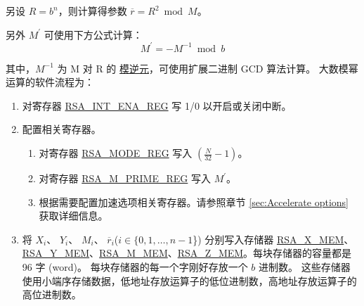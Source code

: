 \documentclass[main\_\_CN.tex]{subfiles}
\begin{document}
另设 \begin{math}R = b^{n}\end{math}，则计算得参数 \begin{math}\overline{r} = R^{2} \bmod M\end{math}。

另外 \begin{math}M^{\prime}\end{math} 可使用下方公式计算：
\[
        M^{\prime} = - M^{-1} \bmod b
\]

其中，$M^{-1}$ 为 M 对 R 的 \href{https://zh.wikipedia.org/wiki/\%E6\%A8\%A1\%E5\%8F\%8D\%E5\%85\%83\%E7\%B4\%A0}{模逆元}，可使用扩展二进制 GCD 算法计算。
大数模幂运算的软件流程为：

\begin{enumerate}

    \item 对寄存器 \hyperref[regdesc:RSAINTENAREG]{RSA\_INT\_ENA\_REG} 写 1/0 以开启或关闭中断。

    \item 配置相关寄存器。

    \begin{enumerate}
        \item 对寄存器 \hyperref[regdesc:RSAMODEREG]{RSA\_MODE\_REG} 写入 \begin{math}( \frac{N}{32} - 1 )\end{math}。

        \item 对寄存器 \hyperref[regdesc:RSAMPRIMEREG]{RSA\_M\_PRIME\_REG} 写入 \begin{math}M^{\prime}\end{math}。

        \item 根据需要配置加速选项相关寄存器。请参照章节 \ref{sec:Accelerate options} 获取详细信息。
    \end{enumerate}

    \item 将
        \begin{math}X_{i}\end{math}、
        \begin{math}Y_{i}\end{math}、
        \begin{math}M_{i}\end{math}、
        \begin{math}\overline{r}_{i}\end{math}(\begin{math}i \in \{ 0, 1, \dots, n-1 \end{math}\})
        分别写入存储器 \hyperref[regdesc:RSAmemory]{RSA\_X\_MEM}、\hyperref[regdesc:RSAmemory]{\hyperref[regdesc:RSAmemory]{RSA\_Y\_MEM}}、\hyperref[regdesc:RSAmemory]{RSA\_M\_MEM}、\hyperref[regdesc:RSAmemory]{RSA\_Z\_MEM}。每块存储器的容量都是 96 字 (word)。
        每块存储器的每一个字刚好存放一个 \begin{math}b\end{math} 进制数。
        这些存储器使用小端序存储数据，低地址存放运算子的低位进制数，高地址存放运算子的高位进制数。


\end{enumerate}
\end{document}
